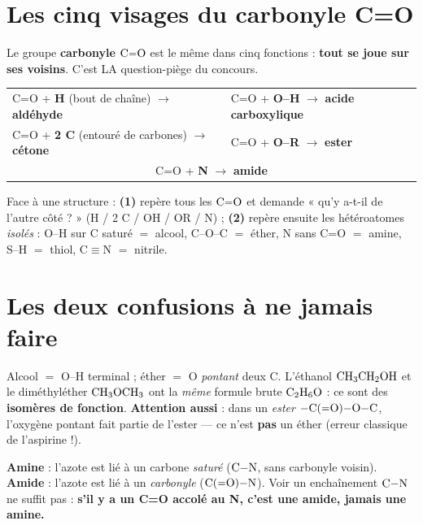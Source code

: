 \documentclass[11pt,a4paper]{article}
\newcommand{\R}{\textcolor{Rcol}{\textbf{R}}}
\begin{document}
\section{Les cinq visages du carbonyle C=O}
Le groupe \textbf{carbonyle} $\ce{C=O}$ est le même dans cinq fonctions : \textbf{tout se joue sur ses voisins}. C'est LA question-piège du concours.
\begin{center}\small\renewcommand{\arraystretch}{1.1}
\begin{tabular}{ll}
C=O + \textbf{H} (bout de chaîne) $\to$ \textbf{aldéhyde} &\quad C=O + \textbf{O--H} $\to$ \textbf{acide carboxylique} \\
C=O + \textbf{2 C} (entouré de carbones) $\to$ \textbf{cétone} &\quad C=O + \textbf{O--\R} $\to$ \textbf{ester} \\
\multicolumn{2}{c}{C=O + \textbf{N} $\to$ \textbf{amide}} \\
\end{tabular}
\end{center}

\begin{astuce}[Méthode « chercher les C=O d'abord »]
Face à une structure : \textbf{(1)} repère tous les $\ce{C=O}$ et demande « qu'y a-t-il de l'autre côté ? » (H / 2 C / OH / OR / N) ; \textbf{(2)} repère ensuite les hétéroatomes \emph{isolés} : O--H sur C saturé $=$ alcool, C--O--C $=$ éther, N sans C=O $=$ amine, S--H $=$ thiol, C$\equiv$N $=$ nitrile.
\end{astuce}

\section{Les deux confusions à ne jamais faire}
\begin{piege}
Alcool $=$ O--H terminal ; éther $=$ O \emph{pontant} deux C. L'éthanol $\ce{CH3CH2OH}$ et le diméthyléther $\ce{CH3OCH3}$ ont la \emph{même} formule brute $\ce{C2H6O}$ : ce sont des \textbf{isomères de fonction}. \textbf{Attention aussi} : dans un \emph{ester} $\ce{-C(=O)-O-C}$, l'oxygène pontant fait partie de l'ester — ce n'est \textbf{pas} un éther (erreur classique de l'aspirine !).
\end{piege}
\begin{piege}
\textbf{Amine} : l'azote est lié à un carbone \emph{saturé} ($\ce{C-N}$, sans carbonyle voisin). \textbf{Amide} : l'azote est lié à un \emph{carbonyle} ($\ce{C(=O)-N}$). Voir un enchaînement $\ce{C-N}$ ne suffit pas : \textbf{s'il y a un C=O accolé au N, c'est une amide, jamais une amine.}
\end{piege}
\end{document}
